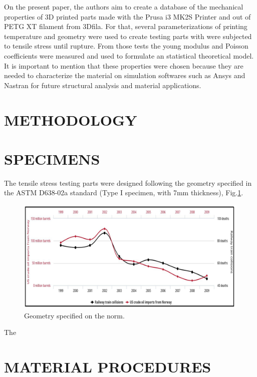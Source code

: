 \documentclass[10pt,fleqn,a4paper,twoside]{article}
\begin{document}
On the present paper, the authors aim to create a database of the mechanical properties of 3D printed parts made with the Prusa i3 MK2S Printer and out of PETG XT filament from 3Dfila. For that, several parameterizations of printing temperature and geometry were used to create testing parts with were subjected to tensile stress until rupture. From those tests the young modulus and Poisson coefficients were measured and used to formulate an statistical theoretical model. It is important to mention that these properties were chosen because they are needed to characterize the material on simulation softwares such as Ansys and Nastran for future structural analysis and material applications.  



\section{METHODOLOGY}





\section{SPECIMENS}

The tensile stress testing parts were designed following the geometry specified in the ASTM D638-02a standard (Type I specimen, with 7mm thickness), Fig.\ref{fig1}. 

\begin{figure}[h!]
	\centering
	\includegraphics[angle=0, scale=0.310]{figure.jpeg}
	\caption{Geometry specified on the norm.}
	\label{fig1}
\end{figure}

The 







\section{MATERIAL PROCEDURES}
\end{document}
